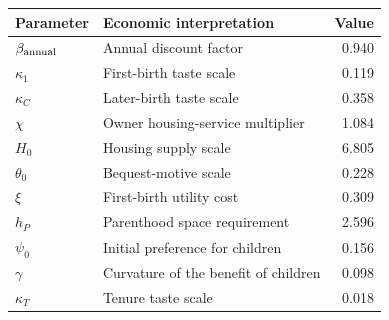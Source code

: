 \begin{tabularx}{\textwidth}{@{}lXr@{}}
\toprule
Parameter & Economic interpretation & Value \\
\midrule
$\beta_{\rm annual}$ & Annual discount factor & 0.940 \\
$\kappa_1$ & First-birth taste scale & 0.119 \\
$\kappa_C$ & Later-birth taste scale & 0.358 \\
$\chi$ & Owner housing-service multiplier & 1.084 \\
$H_0$ & Housing supply scale & 6.805 \\
$\theta_0$ & Bequest-motive scale & 0.228 \\
$\xi$ & First-birth utility cost & 0.309 \\
$h_P$ & Parenthood space requirement & 2.596 \\
$\psi_0$ & Initial preference for children & 0.156 \\
$\gamma$ & Curvature of the benefit of children & 0.098 \\
$\kappa_T$ & Tenure taste scale & 0.018 \\
\bottomrule
\end{tabularx}
